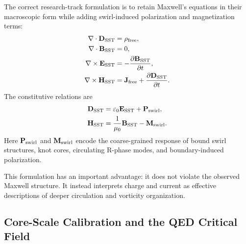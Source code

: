     The correct research-track formulation is to retain Maxwell's equations
    in their macroscopic form while adding swirl-induced polarization and
    magnetization terms:
    \begin{align}
        \nabla\cdot\mathbf{D}_{\rm SST}
        &=
        \rho_{\rm free},
        \label{eq:SST_gauss_D}
        \\
        \nabla\cdot\mathbf{B}_{\rm SST}
        &=
        0,
        \label{eq:SST_gauss_B}
        \\
        \nabla\times\mathbf{E}_{\rm SST}
        &=
        -
        \frac{\partial\mathbf{B}_{\rm SST}}{\partial t},
        \label{eq:SST_faraday}
        \\
        \nabla\times\mathbf{H}_{\rm SST}
        &=
        \mathbf{J}_{\rm free}
        +
        \frac{\partial\mathbf{D}_{\rm SST}}{\partial t}.
        \label{eq:SST_ampere}
    \end{align}
    The constitutive relations are
    \begin{align}
        \mathbf{D}_{\rm SST}
        &=
        \varepsilon_0\mathbf{E}_{\rm SST}
        +
        \mathbf{P}_{\rm swirl},
        \label{eq:D_constitutive_swirl}
        \\
        \mathbf{H}_{\rm SST}
        &=
        \frac{1}{\mu_0}\mathbf{B}_{\rm SST}
        -
        \mathbf{M}_{\rm swirl}.
        \label{eq:H_constitutive_swirl}
    \end{align}
    Here \(\mathbf{P}_{\rm swirl}\) and \(\mathbf{M}_{\rm swirl}\) encode the
    coarse-grained response of bound swirl structures, knot cores, circulating
    R-phase modes, and boundary-induced polarization.
    
    This formulation has an important advantage: it does not violate the
    observed Maxwell structure.  It instead interprets charge and current as
    effective descriptions of deeper circulation and vorticity organization.

\subsection{Core-Scale Calibration and the QED Critical Field}
    
